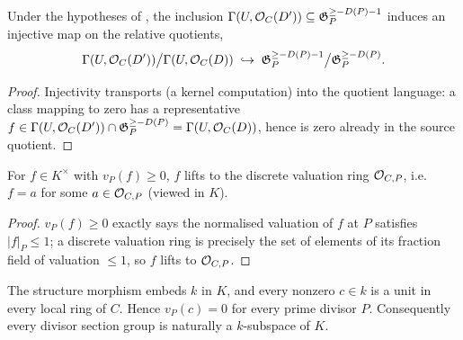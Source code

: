 \begin{theorem}
  \label{thm:adelic_local_step_injective}
  \leanok
  Under the hypotheses of , the
  inclusion \(\Gamma(U, \mathcal{O}_{C}(D')) \subseteq \mathfrak G_P^{\ge
  -D(P)-1}\) induces an injective map on the relative quotients,
  \[
    \Gamma(U, \mathcal{O}_{C}(D')) \big/ \Gamma(U, \mathcal{O}_{C}(D))
      \;\hookrightarrow\;
      \mathfrak G_P^{\ge -D(P)-1} \big/ \mathfrak G_P^{\ge -D(P)}.
  \]
\end{theorem}
\begin{proof}
  \leanok
  Injectivity transports  (a
  kernel computation) into the quotient language: a class mapping to
  zero has a representative \(f \in \Gamma(U, \mathcal{O}_{C}(D')) \cap
  \mathfrak G_P^{\ge -D(P)} = \Gamma(U, \mathcal{O}_{C}(D))\), hence is zero
  already in the source quotient.
\end{proof}

\begin{lemma}
  \label{lem:adelic_order_stalk_integral}
  \leanok
  For \(f \in K^\times\) with \(v_P(f) \ge 0\), \(f\) lifts to the
  discrete valuation ring \(\mathcal{O}_{C, P}\), i.e.\ \(f = a\) for some
  \(a \in \mathcal{O}_{C, P}\) (viewed in \(K\)).
\end{lemma}
\begin{proof}
  \leanok
  \(v_P(f) \ge 0\) exactly says the normalised valuation of \(f\) at
  \(P\) satisfies \(|f|_P \le 1\); a discrete valuation ring is
  precisely the set of elements of its fraction field of valuation
  \(\le 1\), so \(f\) lifts to \(\mathcal{O}_{C, P}\).
\end{proof}

\begin{theorem}
  \label{thm:adelic_constant_field_order_zero}
  \leanok
  The structure morphism embeds \(k\) in \(K\), and every nonzero
  \(c\in k\) is a unit in every local ring of \(C\).  Hence
  \(v_P(c)=0\) for every prime divisor \(P\).  Consequently every divisor
  section group is naturally a \(k\)-subspace of \(K\).
\end{theorem}

